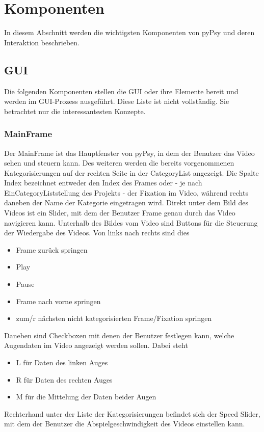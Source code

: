 \documentclass[a4paper,draft]{scrartcl}
\begin{document}
\section{Komponenten}
In diesem Abschnitt werden die wichtigsten Komponenten von pyPsy und deren Interaktion beschrieben.

\subsection{GUI}
Die folgenden Komponenten stellen die GUI oder ihre Elemente bereit und werden im GUI-Prozess ausgef\"uhrt.
Diese Liste ist nicht vollst\"andig.
Sie betrachtet nur die interessantesten Konzepte.

\subsubsection{MainFrame}
Der MainFrame ist das Hauptfenster von pyPsy, in dem der Benutzer das Video sehen und steuern kann. Des weiteren werden die bereits vorgenommenen Kategorisierungen auf der rechten Seite in der CategoryList angezeigt. Die Spalte Index bezeichnet entweder den Index des Frames oder - je nach EinCategoryListstellung des Projekts - der Fixation im Video, während rechts daneben der Name der Kategorie eingetragen wird. 
Direkt unter dem Bild des Videos ist ein Slider, mit dem der Benutzer Frame genau durch das Video navigieren kann.
Unterhalb des Bildes vom Video sind Buttons für die Steuerung der Wiedergabe des Videos. Von links nach rechts sind dies
\begin{itemize}
\item Frame zurück springen
\item Play
\item Pause
\item Frame nach vorne springen
\item zum/r nächsten nicht kategorisierten Frame/Fixation springen
\end{itemize}
Daneben sind Checkboxen mit denen der Benutzer festlegen kann, welche Augendaten im Video angezeigt werden sollen. Dabei steht
\begin{itemize}
\item L für Daten des linken Auges
\item R für Daten des rechten Auges
\item M für die Mittelung der Daten beider Augen
\end{itemize}
Rechterhand unter der Liste der Kategorisierungen befindet sich der Speed Slider, mit dem der Benutzer die Abspielgeschwindigkeit des Videos einstellen kann. 
\end{document}
